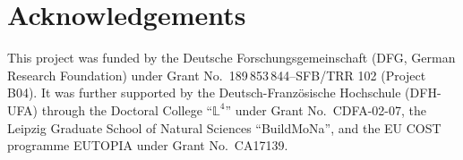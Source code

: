 \documentclass[aps,prx,reprint,showpacs,showkeys,noeprint,longbibliography]{revtex4-1} %
\begin{document}
\section*{Acknowledgements}
This project was funded by the Deutsche Forschungsgemeinschaft (DFG, German Research Foundation) 
under Grant No.\ 189\,853\,844--SFB/TRR 102 (Project B04). It was further 
supported by the Deutsch-Franz\"osische Hochschule (DFH-UFA) 
through the Doctoral College ``$\mathbb{L}^4$'' under Grant No.\ CDFA-02-07, the Leipzig Graduate School of Natural Sciences ``BuildMoNa'', 
and the EU COST programme EUTOPIA under Grant No.\ CA17139.
\end{document}
